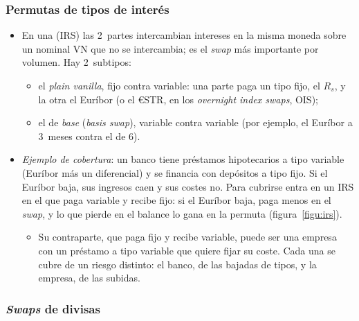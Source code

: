 \documentclass[11pt]{article}
\begin{document}
\subsubsection{Permutas de tipos de interés}\label{sec:irs}

\begin{itemize}
\item En una  (IRS) las 2~partes intercambian intereses en la misma moneda sobre un nominal $\mathrm{VN}$ que no se intercambia; es el \emph{swap} más importante por volumen. Hay 2~subtipos:
  \begin{itemize}
  \item el \emph{plain vanilla}, fijo contra variable: una parte paga un tipo fijo, el  $R_s$, y la otra el Euríbor (o el €STR, en los \emph{overnight index swaps}, OIS);
  \item el de \emph{base} (\emph{basis swap}), variable contra variable (por ejemplo, el Euríbor a 3~meses contra el de 6).
  \end{itemize}
\item \emph{Ejemplo de cobertura}: un banco tiene préstamos hipotecarios a tipo variable (Euríbor más un diferencial) y se financia con depósitos a tipo fijo. Si el Euríbor baja, sus ingresos caen y sus costes no. Para cubrirse entra en un IRS en el que paga variable y recibe fijo: si el Euríbor baja, paga menos en el \emph{swap}, y lo que pierde en el balance lo gana en la permuta (figura~\ref{figu:irs}).
  \begin{itemize}
  \item Su contraparte, que paga fijo y recibe variable, puede ser una empresa con un préstamo a tipo variable que quiere fijar su coste. Cada una se cubre de un riesgo distinto: el banco, de las bajadas de tipos, y la empresa, de las subidas.
  \end{itemize}
\end{itemize}

\begin{infografia}[H]
\centering
\caption{Permuta de tipos de interés fijo contra variable}\label{figu:irs}
\end{infografia}

\subsubsection{\emph{Swaps} de divisas}\label{sec:swaps-divisas}
\end{document}
